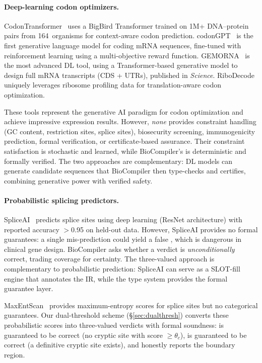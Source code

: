 \paragraph{Deep-learning codon optimizers.}
CodonTransformer~\cite{hashemi2025codontransformer} uses a BigBird
Transformer trained on 1M+ DNA--protein pairs from 164~organisms for
context-aware codon prediction.  codonGPT~\cite{codongpt2025} is the
first generative language model for coding mRNA sequences, fine-tuned
with reinforcement learning using a multi-objective reward function.
GEMORNA~\cite{gemorna2025} is the most advanced DL tool, using a
Transformer-based generative model to design full mRNA transcripts
(CDS + UTRs), published in \emph{Science}.  RiboDecode~\cite{ribodecode2025}
uniquely leverages ribosome profiling data for translation-aware codon
optimization.

These tools represent the generative AI paradigm for codon optimization
and achieve impressive expression results.  However, \emph{none}
provides constraint handling (GC content, restriction sites, splice
sites), biosecurity screening, immunogenicity prediction, formal
verification, or certificate-based assurance.  Their constraint
satisfaction is stochastic and learned, while BioCompiler's is
deterministic and formally verified.  The two approaches are
complementary: DL models can generate candidate sequences that
BioCompiler then type-checks and certifies, combining generative power
with verified safety.

\paragraph{Probabilistic splicing predictors.}
SpliceAI~\cite{jaganathan2019spliceai} predicts splice sites using deep
learning (ResNet architecture) with reported accuracy $>$0.95 on held-out
data.  However, SpliceAI provides no formal guarantees: a single
mis-prediction could yield a false \PASS, which is dangerous in clinical
gene design.  BioCompiler asks whether a \PASS{} verdict is
\emph{unconditionally} correct, trading coverage for certainty.  The
three-valued approach is complementary to probabilistic prediction:
SpliceAI can serve as a SLOT-fill engine that annotates the IR, while
the type system provides the formal guarantee layer.

MaxEntScan~\cite{yeo2004maxentscan} provides maximum-entropy scores
for splice sites but no categorical guarantees.  Our dual-threshold
scheme (\S\ref{sec:dualthresh}) converts these probabilistic scores into
three-valued verdicts with formal soundness: \PASS{} is guaranteed to be
correct (no cryptic site with score $\ge \theta_c$), \FAIL{} is
guaranteed to be correct (a definitive cryptic site exists), and
\UNCERTAIN{} honestly reports the boundary region.

